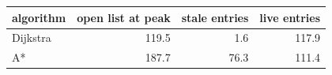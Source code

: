 \begin{tabular}{lrrr}
\toprule
algorithm & open list at peak & stale entries & live entries \\
\midrule
Dijkstra & 119.5 & 1.6 & 117.9 \\
A* & 187.7 & 76.3 & 111.4 \\
\bottomrule
\end{tabular}
